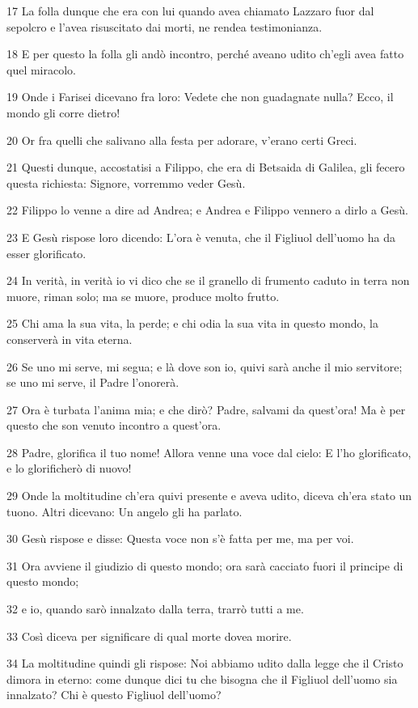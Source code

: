 \par 17 La folla dunque che era con lui quando avea chiamato Lazzaro fuor dal sepolcro e l'avea risuscitato dai morti, ne rendea testimonianza.
\par 18 E per questo la folla gli andò incontro, perché aveano udito ch'egli avea fatto quel miracolo.
\par 19 Onde i Farisei dicevano fra loro: Vedete che non guadagnate nulla? Ecco, il mondo gli corre dietro!
\par 20 Or fra quelli che salivano alla festa per adorare, v'erano certi Greci.
\par 21 Questi dunque, accostatisi a Filippo, che era di Betsaida di Galilea, gli fecero questa richiesta: Signore, vorremmo veder Gesù.
\par 22 Filippo lo venne a dire ad Andrea; e Andrea e Filippo vennero a dirlo a Gesù.
\par 23 E Gesù rispose loro dicendo: L'ora è venuta, che il Figliuol dell'uomo ha da esser glorificato.
\par 24 In verità, in verità io vi dico che se il granello di frumento caduto in terra non muore, riman solo; ma se muore, produce molto frutto.
\par 25 Chi ama la sua vita, la perde; e chi odia la sua vita in questo mondo, la conserverà in vita eterna.
\par 26 Se uno mi serve, mi segua; e là dove son io, quivi sarà anche il mio servitore; se uno mi serve, il Padre l'onorerà.
\par 27 Ora è turbata l'anima mia; e che dirò? Padre, salvami da quest'ora! Ma è per questo che son venuto incontro a quest'ora.
\par 28 Padre, glorifica il tuo nome! Allora venne una voce dal cielo: E l'ho glorificato, e lo glorificherò di nuovo!
\par 29 Onde la moltitudine ch'era quivi presente e aveva udito, diceva ch'era stato un tuono. Altri dicevano: Un angelo gli ha parlato.
\par 30 Gesù rispose e disse: Questa voce non s'è fatta per me, ma per voi.
\par 31 Ora avviene il giudizio di questo mondo; ora sarà cacciato fuori il principe di questo mondo;
\par 32 e io, quando sarò innalzato dalla terra, trarrò tutti a me.
\par 33 Così diceva per significare di qual morte dovea morire.
\par 34 La moltitudine quindi gli rispose: Noi abbiamo udito dalla legge che il Cristo dimora in eterno: come dunque dici tu che bisogna che il Figliuol dell'uomo sia innalzato? Chi è questo Figliuol dell'uomo?
